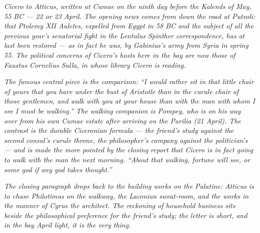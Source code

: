 
\textit{Cicero to Atticus, written at Cumae on the ninth day
before the Kalends of May, 55 BC --- 22 or 23 April. The
opening news comes from down the road at Puteoli: that
Ptolemy XII Auletes, expelled from Egypt in 58 BC and the
subject of all the previous year's senatorial fight in the
Lentulus Spinther correspondence, has at last been restored
--- as in fact he was, by Gabinius's army from Syria in
spring 55. The political concerns of Cicero's hosts here
in the bay are now those of Faustus Cornelius Sulla, in
whose library Cicero is reading.}

\textit{The famous central piece is the comparison: ``I
would rather sit in that little chair of yours that you have
under the bust of Aristotle than in the curule chair of
those gentlemen, and walk with you at your house than with
the man with whom I see I must be walking.'' The walking
companion is Pompey, who is on his way over from his own
Cumae estate after arriving on the Parilia (21 April). The
contrast is the durable Ciceronian formula --- the friend's
study against the second consul's curule throne, the
philosopher's company against the politician's --- and is
made the more pointed by the closing report that Cicero is
in fact going to walk with the man the next morning. ``About
that walking, fortune will see, or some god if any god takes
thought.''}

\textit{The closing paragraph drops back to the building works
on the Palatine: Atticus is to chase Philotimus on the
walkway, the Laconian sweat-room, and the works in the manner
of Cyrus the architect. The reckoning of household business
sits beside the philosophical preference for the friend's
study; the letter is short, and in the bay April light, it
is the very thing.}
